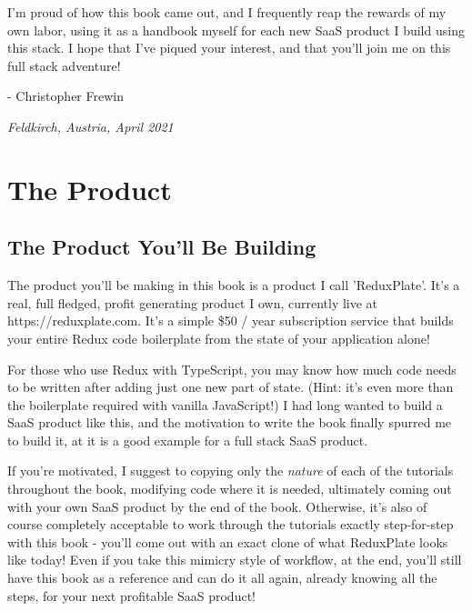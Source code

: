 \documentclass[a4paper,
                             oneside,
                             BCOR1.0cm,
                             DIV11,
                             parskip=full,
                             11pt]{scrbook}
\begin{document}

I'm proud of how this book came out, and I frequently reap the rewards of my own labor, using it as a handbook myself for each new SaaS product I build using this stack. I hope that I've piqued your interest, and that you'll join me on this full stack adventure!

- Christopher Frewin

\textit{Feldkirch, Austria, April 2021}

\chapter{The Product}\label{cap:primer}

\section{The Product You'll Be Building}\label{sec:titles}

The product you'll be making in this book is a product I call 'ReduxPlate'. It's a real, full fledged, profit generating product I own, currently live at https://reduxplate.com. It's a simple \$50 / year subscription service that builds your entire Redux code boilerplate from the state of your application alone! 

For those who use Redux with TypeScript, you may know how much code needs to be written after adding just one new part of state. (Hint: it's even more than the boilerplate required with vanilla JavaScript!) I had long wanted to build a SaaS product like this, and the motivation to write the book finally spurred me to build it, at it is a good example for a full stack SaaS product. 


If you're motivated, I suggest to copying only the \textit{nature} of each of the tutorials throughout the book, modifying code where it is needed, ultimately coming out with your own SaaS product by the end of the book. Otherwise, it's also of course completely acceptable to work through the tutorials exactly step-for-step with this book - you'll come out with an exact clone of what ReduxPlate looks like today! Even if you take this mimicry style of workflow, at the end, you'll still have this book as a reference and can do it all again, already knowing all the steps, for your next profitable SaaS product!
\end{document}
